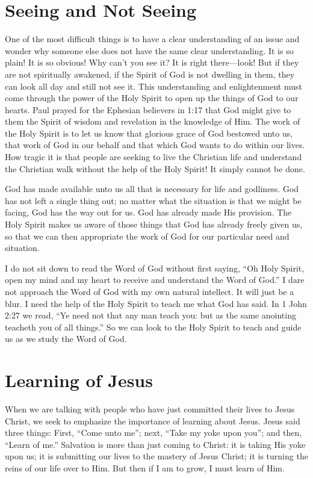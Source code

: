 \section*{Seeing and Not Seeing}

One of the most difficult things is to have a clear understanding of an issue and wonder why someone else does 
not have the same clear understanding. It is so plain! It is so 
obvious! Why can’t you see it? It is right there—look! But if 
they are not spiritually awakened, if the Spirit of God is not 
dwelling in them, they can look all day and still not see it. 
This understanding and enlightenment must come through 
the power of the Holy Spirit to open up the things of God 
to our hearts. Paul prayed for the Ephesian believers in 1:17 
that God might give to them the Spirit of wisdom and revelation in the knowledge of Him. The work of the Holy 
Spirit is to let us know that glorious grace of God bestowed 
unto us, that work of God in our behalf and that which God 
wants to do within our lives. How tragic it is that people 
are seeking to live the Christian life and understand the 
Christian walk without the help of the Holy Spirit! It simply 
cannot be done.

God has made available unto us all that is necessary for 
life and godliness. God has not left a single thing out; no 
matter what the situation is that we might be facing, God 
has the way out for us. God has already made His provision. The Holy Spirit makes us aware of those things that 
God has already freely given us, so that we can then appropriate the work of God for our particular need and situation.

I do not sit down to read the Word of God without 
first saying, “Oh Holy Spirit, open my mind and my heart 
to receive and understand the Word of God.” I dare not 
approach the Word of God with my own natural intellect. It 
will just be a blur. I need the help of the Holy Spirit to teach 
me what God has said. In 1 John 2:27 we read, “Ye need not 
that any man teach you: but as the same anointing teacheth 
you of all things.” So we can look to the Holy Spirit to teach 
and guide us as we study the Word of God.


\section*{Learning of Jesus}

When we are talking with people who have just committed their lives to Jesus Christ, we seek to emphasize the 
importance of learning about Jesus. Jesus said three things: 
First, “Come unto me”; next, “Take my yoke upon you”; 
and then, “Learn of me.” Salvation is more than just coming 
to Christ: it is taking His yoke upon us; it is submitting our
lives to the mastery of Jesus Christ; it is turning the reins of 
our life over to Him. But then if I am to grow, I must learn 
of Him.

